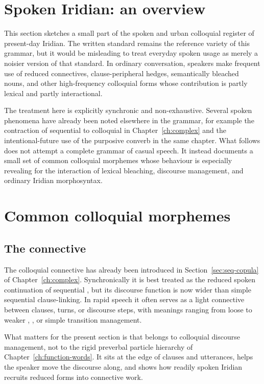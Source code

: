 \section{Spoken Iridian: an overview}\label{sec:spoken-overview}

This section sketches a small part of the spoken and urban colloquial register
of present-day Iridian. The written standard remains the reference variety of
this grammar, but it would be misleading to treat everyday spoken usage as
merely a noisier version of that standard. In ordinary conversation, speakers
make frequent use of reduced connectives, clause-peripheral hedges, semantically
bleached nouns, and other high-frequency colloquial forms whose contribution is
partly lexical and partly interactional.

The treatment here is explicitly synchronic and non-exhaustive. Several spoken
phenomena have already been noted elsewhere in the grammar, for example the
contraction of sequential  to colloquial  in
Chapter~\ref{ch:complex} and the intentional-future use of the purposive converb
in the same chapter. What follows does not attempt a complete grammar of casual
speech. It instead documents a small set of common colloquial morphemes whose
behaviour is especially revealing for the interaction of lexical bleaching,
discourse management, and ordinary Iridian morphosyntax.

\section{Common colloquial morphemes}\label{sec:spoken-morphemes}

\subsection{The connective }\label{sec:spoken-nu}

The colloquial connective  has already been introduced in
Section~\ref{sec:seq-copula} of Chapter~\ref{ch:complex}. Synchronically it is
best treated as the reduced spoken continuation of sequential , but
its discourse function is now wider than simple sequential clause-linking. In
rapid speech it often serves as a light connective between clauses, turns, or
discourse steps, with meanings ranging from loose  to weaker
, , or simple transition management.

What matters for the present section is that  belongs to colloquial
discourse management, not to the rigid preverbal particle hierarchy of
Chapter~\ref{ch:function-words}. It sits at the edge of clauses and utterances,
helps the speaker move the discourse along, and shows how readily spoken Iridian
recruits reduced forms into connective work.

